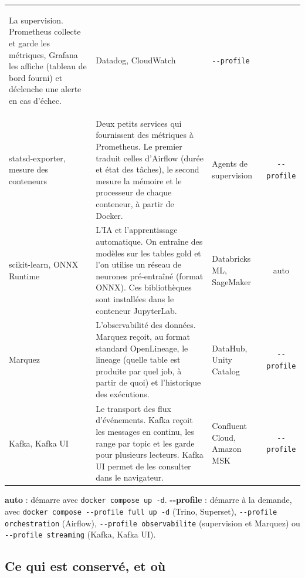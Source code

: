 \documentclass[11pt,a4paper]{article}
\newcommand{\cmd}[1]{\texttt{#1}}
\begin{document}
{\begin{xltabular}{\textwidth}{@{}>{\bfseries\raggedright\arraybackslash}p{2.9cm}
  >{\raggedright\arraybackslash}X >{\raggedright\arraybackslash}p{3.2cm} c@{}}
  La supervision. Prometheus collecte et garde les métriques, Grafana les affiche
  (tableau de bord fourni) et déclenche une alerte en cas d'échec. &
  Datadog, CloudWatch & \texttt{-{}-profile} \\
statsd-exporter, mesure des conteneurs &
  Deux petits services qui fournissent des métriques à Prometheus. Le premier traduit celles
  d'Airflow (durée et état des tâches), le second mesure la mémoire et le processeur de chaque
  conteneur, à partir de Docker. &
  Agents de supervision & \texttt{-{}-profile} \\
scikit-learn, ONNX Runtime &
  L'IA et l'apprentissage automatique. On entraîne des modèles sur les tables gold et l'on
  utilise un réseau de neurones pré-entraîné (format ONNX). Ces bibliothèques sont installées dans
  le conteneur JupyterLab. &
  Databricks ML, SageMaker & auto \\
Marquez &
  L'observabilité des données. Marquez reçoit, au format standard OpenLineage, le lineage
  (quelle table est produite par quel job, à partir de quoi) et l'historique des exécutions. &
  DataHub, Unity Catalog & \texttt{-{}-profile} \\
Kafka, Kafka UI &
  Le transport des flux d'événements. Kafka reçoit les messages en continu, les range par topic et
  les garde pour plusieurs lecteurs. Kafka UI permet de les consulter dans le navigateur. &
  Confluent Cloud, Amazon MSK & \texttt{-{}-profile} \\
\end{xltabular}

\smallskip
{\footnotesize \textbf{auto} : démarre avec \cmd{docker compose up -d}. \quad
\textbf{-{}-profile} : démarre à la demande, avec \cmd{docker compose -{}-profile full up -d}
(Trino, Superset), \cmd{-{}-profile orchestration} (Airflow), \cmd{-{}-profile observabilite}
(supervision et Marquez) ou \cmd{-{}-profile streaming} (Kafka, Kafka UI).}
}


\subsection*{Ce qui est conservé, et où}
\end{document}
